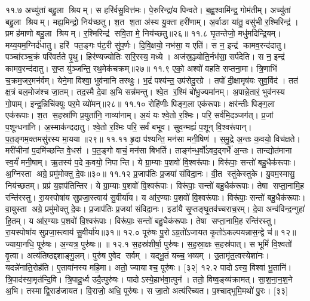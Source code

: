११.७
अच्यु॑तां बहु॒ला श्रियम्। स हरि॑र्वसु॒वित्त॑मः। पे॒रुरिन्द्रा॑य पिन्वते। ब॒ह्व॒श्वामि॑न्द्र॒ गोम॑तीम्। अच्यु॑तां बहु॒ला श्रियम्। मह्य॒मिन्द्रो॒ निय॑च्छतु। श॒त श॒ता अ॑स्य यु॒क्ता हरी॑णाम्। अ॒र्वाङा या॑तु॒ वसु॑भी र॒श्मिरिन्द्र॑। प्रमह॑माणो बहु॒ला श्रियम्। र॒श्मिरिन्द्र॑ सवि॒ता मे॒ निय॑च्छतु॥२६॥%
११.८
घृ॒तन्तेजो॒ मधु॑मदिन्द्रि॒यम्। मय्य॒यम॒ग्निर्द॑धातु। हरि॑ पत॒ङ्गः प॑ट॒री सु॑प॒र्णः। दि॒वि॒क्षयो॒ नभ॑सा॒ य एति॑। स न॒ इन्द्र॑ कामव॒रन्द॑दातु। पञ्चा॑रञ्च॒क्रं परि॑वर्तते पृ॒थु। हिर॑ण्यज्योतिः सरि॒रस्य॒ मध्ये। अज॑स्र॒ञ्ज्योति॒र्नभ॑सा॒ सर्प॑देति। स न॒ इन्द्र॑ कामव॒रन्द॑दातु। स॒प्त यु॑ञ्जन्ति॒ रथ॒मेक॑चक्रम्॥२७॥%
११.९
एको॒ अश्वो॑ वहति सप्तना॒मा। त्रि॒णाभि॑ च॒क्रम॒जर॒मन॑र्वम्। येने॒मा विश्वा॒ भुव॑नानि तस्थुः। भ॒द्रं पश्य॑न्त॒ उप॑सेदु॒रग्रे। तपो॑ दी॒क्षामृष॑यः सुव॒र्विद॑। तत॑ क्ष॒त्रं बल॒मोज॑श्च जा॒तम्। तद॒स्मै दे॒वा अ॒भि सन्न॑मन्तु। श्वे॒त र॒श्मिं बो॑भु॒ज्यमा॑नम्। अ॒पान्ने॒तारं॒ भुव॑नस्य गो॒पाम्। इन्द्र॒न्निचि॑क्युः पर॒मे व्यो॑मन्॥२८॥
११.१०
रोहि॑णीः पिङ्ग॒ला एक॑रूपाः। क्षर॑न्तीः पिङ्ग॒ला एक॑रूपाः। श॒त स॒हस्रा॑णि प्र॒युता॑नि॒ नाव्या॑नाम्। अ॒यं यः श्वे॒तो र॒श्मिः। परि॒ सर्व॑मि॒दञ्जग॑त्। प्र॒जां प॒शून्धना॑नि। अ॒स्माक॑न्ददातु। श्वे॒तो र॒श्मिः परि॒ सर्वं॑ बभूव। सुव॒न्मह्यं॑ प॒शून् वि॒श्वरू॑पान्। प॒त॒ङ्गम॒क्तमसु॑रस्य मा॒यया॥२९॥%
११.११
हृ॒दा प॑श्यन्ति॒ मन॑सा मनी॒षिण॑। स॒मु॒द्रे अ॒न्तः क॒वयो॒ विच॑क्षते। मरी॑चीनां प॒दमि॑च्छन्ति वे॒धस॑। प॒त॒ङ्गो वाचं॒ मन॑सा बिभर्ति। ताङ्ग॑न्ध॒र्वो॑ऽवद॒द्गर्भे॑ अ॒न्तः। तान्द्योत॑माना स्व॒र्यं॑ मनी॒षाम्। ऋ॒तस्य॑ प॒दे क॒वयो॒ निपान्ति। ये ग्रा॒म्याः प॒शवो॑ वि॒श्वरू॑पाः। विरू॑पाः॒ सन्तो॑ बहु॒धैक॑रूपाः। अ॒ग्निस्ता अग्रे॒ प्रमु॑मोक्तु दे॒वः॥३०॥
११.१२
प्र॒जाप॑तिः प्र॒जया॑ संविदा॒नः। वी॒त स्तु॑केस्तुके। यु॒वम॒स्मासु॒ निय॑च्छतम्। प्रप्र॑ य॒ज्ञप॑तिन्तिर। ये ग्रा॒म्याः प॒शवो॑ वि॒श्वरू॑पाः। विरू॑पाः॒ सन्तो॑ बहु॒धैक॑रूपाः। तेषा सप्ता॒नामि॒ह रन्ति॑रस्तु। रा॒यस्पोषा॑य सुप्रजा॒स्त्वाय॑ सु॒वीर्या॑य। य आ॑र॒ण्याः प॒शवो॑ वि॒श्वरू॑पाः। विरू॑पाः॒ सन्तो॑ बहु॒धैक॑रूपाः। वा॒युस्ता अग्रे॒ प्रमु॑मोक्तु दे॒वः। प्र॒जाप॑तिः प्र॒जया॑ संविदा॒नः। इडा॑यै सृ॒प्तङ्घृ॒तव॑च्चराच॒रम्। दे॒वा अन्व॑विन्द॒न्गुहा॑ हि॒तम्। य आ॑र॒ण्याः प॒शवो॑ वि॒श्वरू॑पाः। विरू॑पाः॒ सन्तो॑ बहु॒धैक॑रूपाः। तेषा सप्ता॒नामि॒ह रन्ति॑रस्तु। रा॒यस्पोषा॑य सुप्रजा॒स्त्वाय॑ सु॒वीर्या॑य॥३१॥
१२.०
पूरु॑षः पु॒रोऽग्र॒तो॑ऽजायत कृ॒तो॑ऽकल्पयन्नास॒न्द्वे च॑॥ १२॥ज्याया॒नधि॒ पूरु॑षः। अ॒न्यत्र॒ पुरु॑षः॥ ॥
\anuvakamend
१२.१
स॒हस्र॑शीर्\mbox{}षा॒ पुरु॑षः। स॒ह॒स्रा॒क्षः स॒हस्र॑पात्। स भूमिं॑ वि॒श्वतो॑ वृ॒त्वा। अत्य॑तिष्ठद्दशाङ्गु॒लम्। पुरु॑ष ए॒वेद सर्वम्। यद्भू॒तं यच्च॒ भव्यम्। उ॒तामृ॑त॒त्वस्येशा॑नः। यदन्ने॑नाति॒रोह॑ति। ए॒तावा॑नस्य महि॒मा। अतो॒ ज्यायाश्च॒ पूरु॑षः। [३२]
१२.२
पादोऽस्य॒ विश्वा॑ भू॒तानि॑। त्रि॒पाद॑स्या॒मृत॑न्दि॒वि। त्रि॒पादू॒र्ध्व उदै॒त्पुरु॑षः। पादोऽस्ये॒हाभ॑वा॒त्पुन॑। ततो॒ विष्व॒ङ्व्य॑क्रामत्। सा॒श॒ना॒न॒श॒ने अ॒भि। तस्माद्वि॒राड॑जायत। वि॒राजो॒ अधि॒ पूरु॑षः। स जा॒तो अत्य॑रिच्यत। प॒श्चाद्भूमि॒मथो॑ पु॒रः। [३३]
